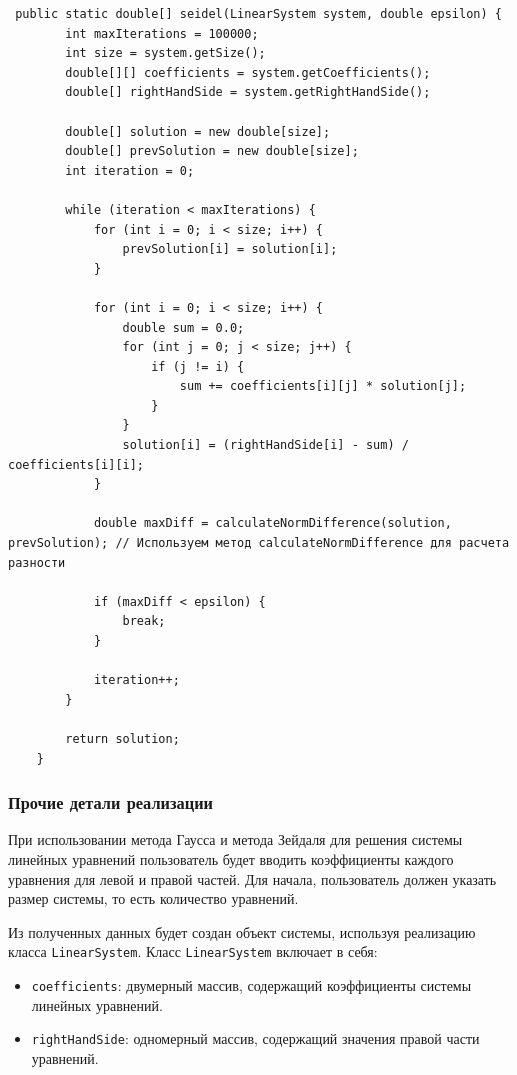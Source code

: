 \documentclass[12pt]{article}
\begin{document}
\begin{verbatim}
 public static double[] seidel(LinearSystem system, double epsilon) {
        int maxIterations = 100000;
        int size = system.getSize();
        double[][] coefficients = system.getCoefficients();
        double[] rightHandSide = system.getRightHandSide();

        double[] solution = new double[size];
        double[] prevSolution = new double[size];
        int iteration = 0;

        while (iteration < maxIterations) {
            for (int i = 0; i < size; i++) {
                prevSolution[i] = solution[i];
            }

            for (int i = 0; i < size; i++) {
                double sum = 0.0;
                for (int j = 0; j < size; j++) {
                    if (j != i) {
                        sum += coefficients[i][j] * solution[j];
                    }
                }
                solution[i] = (rightHandSide[i] - sum) / coefficients[i][i];
            }

            double maxDiff = calculateNormDifference(solution, prevSolution); // Используем метод calculateNormDifference для расчета разности

            if (maxDiff < epsilon) {
                break;
            }

            iteration++;
        }

        return solution;
    }
\end{verbatim}

\subsubsection{Прочие детали реализации}

При использовании метода Гаусса и метода Зейдаля для решения системы линейных уравнений пользователь будет вводить коэффициенты каждого уравнения для левой и правой частей. Для начала, пользователь должен указать размер системы, то есть количество уравнений.

Из полученных данных будет создан объект системы, используя реализацию класса \texttt{LinearSystem}. Класс \texttt{LinearSystem} включает в себя:

\begin{itemize}
  \item \texttt{coefficients}: двумерный массив, содержащий коэффициенты системы линейных уравнений.
  \item \texttt{rightHandSide}: одномерный массив, содержащий значения правой части уравнений.
\end{itemize}
\end{document}
